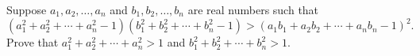 Suppose $a_1, a_2, \ldots, a_n$ and $b_1, b_2, \ldots, b_n$ are real numbers such that \[ (a_1 ^ 2 + a_2 ^ 2 + \cdots + a_n ^ 2 -1)(b_1 ^ 2 + b_2 ^ 2 + \cdots + b_n ^ 2 - 1) > (a_1 b_1 + a_2 b_2 + \cdots + a_n b_n - 1)^2. \] Prove that $a_1 ^ 2 + a_2 ^ 2 + \cdots + a_n ^ 2 > 1$ and $b_1 ^ 2 + b_2 ^ 2 + \cdots + b_n ^ 2 > 1$.